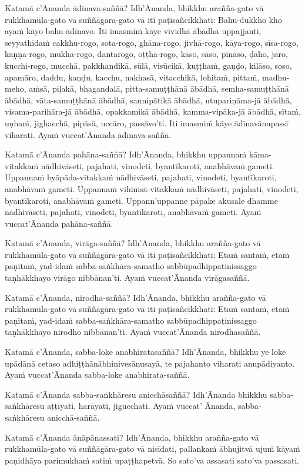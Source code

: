 Katamā c’Ānanda ādīnava-saññā? Idh’Ānanda, bhikkhu arañña-gato vā
rukkhamūla-gato vā suññāgāra-gato vā iti paṭisañcikkhati: Bahu-dukkho kho ayaṁ
kāyo bahu-ādīnavo. Iti imasmiṁ kāye vividhā ābādhā uppajjanti, seyyathīdaṁ
cakkhu-rogo, sota-rogo, ghāna-rogo, jivhā-rogo, kāya-rogo, sīsa-rogo,
kaṇṇa-rogo, mukha-rogo, dantarogo, oṭṭha-rogo, kāso, sāso, pināso, ḍāho, jaro,
kucchi-rogo, mucchā, pakkhandikā, sūlā, visūcikā, kuṭṭhaṁ, gaṇḍo, kilāso, soso,
apamāro, daddu, kaṇḍu, kacchu, nakhasā, vitacchikā, lohitaṁ, pittaṁ, madhu-meho,
aṁsā, piḷakā, bhagandalā, pitta-samuṭṭhānā ābādhā, semha-samuṭṭhānā ābādhā,
vāta-samuṭṭhānā ābādhā, sannipātikā ābādhā, utupariṇāma-jā ābādhā,
visama-parihāra-jā ābādhā, opakkamikā ābādhā, kamma-vipāka-jā ābādhā, sītaṁ,
uṇhaṁ, jighacchā, pipāsā, uccāro, passāvo’ti. Iti imasmiṁ kāye ādīnavānupassī
viharati. Ayaṁ vuccat’Ānanda ādīnava-saññā.

\ifhandbookedition
\enlargethispage{\baselineskip}
\fi

Katamā c’Ānanda pahāna-saññā? Idh’Ānanda, bhikkhu uppannaṁ kāma-vitakkaṁ
nādhivāseti, pajahati, vinodeti, byantīkaroti, anabhāvaṁ gameti. Uppannaṁ
byāpāda-vitakkaṁ nādhivāseti, pajahati, vinodeti, byantīkaroti, anabhāvaṁ
gameti. Uppannaṁ vihiṁsā-vitakkaṁ nādhivāseti, pajahati, vinodeti, byantīkaroti,
anabhāvaṁ gameti. Uppann’uppanne pāpake akusale dhamme nādhivāseti, pajahati,
vinodeti, byantīkaroti, anabhāvaṁ gameti. Ayaṁ vuccat’Ānanda pahāna-saññā.

Katamā c’Ānanda, virāga-saññā? Idh’Ānanda, bhikkhu arañña-gato vā
rukkhamūla-gato vā suññāgāra-gato vā iti paṭisañcikkhati: Etaṁ santaṁ, etaṁ
paṇītaṁ, yad-idaṁ sabba-saṅkhāra-samatho sabbūpadhippaṭinissaggo taṇhākkhayo
virāgo nibbānan’ti. Ayaṁ vuccat’Ānanda virāgasaññā.

Katamā c’Ānanda, nirodha-saññā? Idh’Ānanda, bhikkhu arañña-gato vā
rukkhamūla-gato vā suññāgāra-gato vā iti paṭisañcikkhati: Etaṁ santaṁ, etaṁ
paṇītaṁ, yad-idaṁ sabba-saṅkhāra-samatho sabbūpadhippaṭinissaggo taṇhākkhayo
nirodho nibbānan’ti. Ayaṁ vuccat’Ānanda nirodhasaññā.

Katamā c’Ānanda, sabba-loke anabhiratasaññā? Idh’Ānanda, bhikkhu ye loke
upādānā cetaso adhiṭṭhānābhinivesānusayā, te pajahanto viharati anupādiyanto.
Ayaṁ vuccat’Ānanda sabba-loke anabhirata-saññā.

Katamā c’Ānanda sabba-saṅkhāresu anicchāsaññā? Idh’Ānanda bhikkhu
sabba-saṅkhāresu aṭṭīyati, harāyati, jigucchati. Ayaṁ vuccat’ Ānanda,
sabba-saṅkhāresu anicchā-saññā.

Katamā c’Ānanda ānāpānassati?
Idh’Ānanda, bhikkhu arañña-gato vā rukkhamūla-gato vā suññāgāra-gato vā nisīdati,
pallaṅkaṁ ābhujitvā ujuṁ kāyaṁ paṇidhāya parimukhaṁ satiṁ upaṭṭhapetvā. So sato’va
assasati sato’va passasati.

